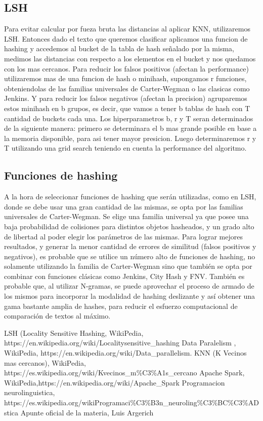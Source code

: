 \documentclass[a4paper,10pt]{article}
\begin{document}
	
	\subsection{LSH}
	
	Para evitar calcular por fueza bruta las distancias al aplicar KNN, utilizaremos LSH. Entonces dado el texto que queremos clasificar aplicamos una funcion de hashing y accedemos al bucket de la tabla de hash se\~{n}alado por la misma, medimos las distancias con respecto a los elementos en el bucket y nos quedamos con los mas cercanos. Para reducir los falsos positivos (afectan la performance) utilizaremos mas de una funcion de hash o minihash, supongamos r funciones, obteniendolas de las familias universales de Carter-Wegman o las clasicas como Jenkins. Y para reducir los falsos negativos (afectan la precision) agruparemos estos minihash en b grupos, es decir, que vamos a tener b tablas de hash con T cantidad de buckets cada una.
	 Los hiperparametros b, r y T seran determinados de la siguiente manera: primero se determinara el b mas grande posible en base a la memoria disponible, para asi tener mayor presicion. Luego determinaremos r y T utilizando una grid search teniendo en cuenta la performance del algoritmo.

	
	\subsection{Funciones de hashing}

	A la hora de seleccionar funciones de hashing que ser\'{a}n utilizadas, como en LSH, donde se debe usar una gran cantidad de las mismas, se opta por las familias universales de Carter-Wegman. Se elige una familia universal ya que posee una baja probabilidad de colisiones para distintos objetos hasheados, y un grado alto de libertad al poder elegir los par\'{a}metros de las mismas. Para lograr mejores resultados, y generar la menor cantidad de errores de similitud (falsos positivos y negativos), es probable que se utilice un n\'{u}mero alto de funciones de hashing, no solamente utilizando la familia de Carter-Wegman sino que tambi\'{e}n se opta por combinar con funciones cl\'{a}sicas como Jenkins, City Hash y FNV.
	Tambi\'{e}n es probable que, al utilizar N-gramas, se puede aprovechar el proceso de armado de los mismos para incorporar la modalidad de hashing deslizante y as\'{i} obtener una gama bastante amplia de hashes, para reducir el esfuerzo computacional de comparaci\'{o}n de textos al m\'{a}ximo.
	
	\begin{thebibliography}{99}
		 LSH (Locality Sensitive Hashing, WikiPedia, https://en.wikipedia.org/wiki/Locality\-sensitive\_hashing
		 Data Paralelism , WikiPedia, https://en.wikipedia.org/wiki/Data\_parallelism.
		 KNN (K Vecinos mas cercanos), WikiPedia, https://es.wikipedia.org/wiki/K\-vecinos\_m\%C3\%A1s\_cercano
		 Apache Spark, WikiPedia,https://en.wikipedia.org/wiki/Apache\_Spark
		 Programacion neurolinguistica, https://es.wikipedia.org/wikiProgramaci\%C3\%B3n\_neuroling\%C3\%BC\%C3\%ADstica
		 Apunte oficial de la materia, Luis Argerich

	\end{thebibliography}
	
\end{document}
